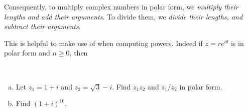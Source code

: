 \documentclass[11pt,fleqn,dvipsnames,usenames]{article}
\newcommand{\p}{\noindent}
\begin{document}
\p Consequently, to multiply complex numbers in polar form, we \emph{multiply their lengths and add their arguments}.  To divide them, we \emph{divide their lengths, and subtract their arguments}.
\newpage

\p This is helpful to make use of when computing powers.  Indeed if $z = re^{i\theta}$ is in polar form and $n\geq 0$, then
\vspace{4cm}

\vsp

\prf
\vspace{2cm}

\begin{examples}~
\begin{enumerate}[(a)]
\item Let $z_{1} = 1 + i$ and $z_{2}  = \sqrt{3} - i$.  Find $z_{1}z_{2}$ and $z_{1}/z_{2}$ in polar form.
\item Find $(1 + i)^{16}$.
\end{enumerate}
\end{examples}
\newpage
\end{document}
